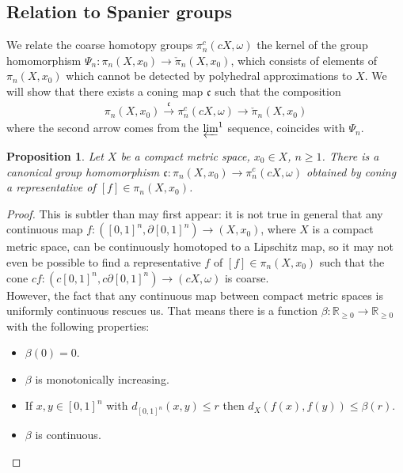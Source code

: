 \documentclass[a4paper,11pt]{article}
\theoremstyle{definition}
\theoremstyle{plain}
\newtheorem{prop}[definition]{Proposition}
\theoremstyle{remark}
\begin{document}
{\begin{enumerate}
\end{enumerate}

\subsection{Relation to Spanier groups}

We relate the coarse homotopy groups $\pi_{n}^c(cX,\omega)$ the kernel of the group homomorphism $\Psi_{n}:\pi_{n}(X,x_0) \rightarrow \check{\pi}_{n}(X,x_0)$, which consists of elements of $\pi_{n}(X,x_0)$ which cannot be detected by polyhedral approximations to $X$. We will show that there exists a coning map $\mathfrak{c}$ such that the composition 
\begin{align*}
\pi_{n}(X,x_0)\xrightarrow{\mathfrak{c}}\pi_{n}^{c}(cX,\omega)\rightarrow \check{\pi}_{n}(X,x_0)
\end{align*}
where the second arrow comes from the $\varprojlim^1$ sequence, coincides with $\Psi_{n}$.\\

\begin{prop} \label{unicoarse} Let $X$ be a compact metric space, $x_0\in X$, $n\geq 1$. There is a canonical group homomorphism $\mathfrak{c}: \pi_{n}(X,x_0)\rightarrow \pi_{n}^{c}(cX,\omega)$ obtained by coning a representative of $[f]\in \pi_{n}(X,x_0)$. 
\end{prop}
\begin{proof} This is subtler than may first appear: it is not true in general that any continuous map $f: ([0,1]^n,\partial[0,1]^n)\rightarrow (X,x_0)$, where $X$ is a compact metric space, can be continuously homotoped to a Lipschitz map, so it may not even be possible to find a representative $f$ of $[f]\in \pi_{n}(X,x_0)$ such that the cone $cf: (c[0,1]^n,c\partial[0,1]^n)\rightarrow (cX,\omega)$ is coarse. \\

However, the fact that any continuous map between compact metric spaces is uniformly continuous rescues us.  That means there is a function $\beta: \mathbb{R}_{\geq 0} \rightarrow \mathbb{R}_{\geq 0}$ with the following properties:
\begin{itemize}
\item $\beta(0) = 0$. 
\item $\beta$ is monotonically increasing. 
\item If $x,y\in [0,1]^n$ with $d_{[0,1]^n}(x,y)\leq r$ then $d_{X}(f(x),f(y))\leq \beta(r)$. 
\item $\beta$ is continuous. 
\end{itemize}


\end{proof}}
\end{document}
